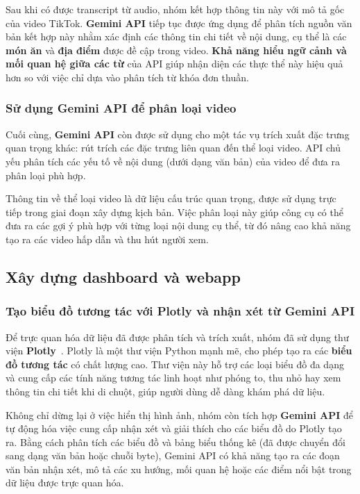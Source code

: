 Sau khi có được transcript từ audio, nhóm kết hợp thông tin này với mô tả gốc của video TikTok. \textbf{Gemini API} tiếp tục được ứng dụng để phân tích nguồn văn bản kết hợp này nhằm xác định các thông tin chi tiết về nội dung, cụ thể là các \textbf{món ăn} và \textbf{địa điểm} được đề cập trong video. \textbf{Khả năng hiểu ngữ cảnh và mối quan hệ giữa các từ} của API giúp nhận diện các thực thể này hiệu quả hơn so với việc chỉ dựa vào phân tích từ khóa đơn thuần.

\subsubsection{Sử dụng Gemini API để phân loại video}

Cuối cùng, \textbf{Gemini API} còn được sử dụng cho một tác vụ trích xuất đặc trưng quan trọng khác: rút trích các đặc trưng liên quan đến thể loại video. API chủ yếu phân tích các yếu tố về nội dung (dưới dạng văn bản) của video để đưa ra phân loại phù hợp.

Thông tin về thể loại video là dữ liệu cấu trúc quan trọng, được sử dụng trực tiếp trong giai đoạn xây dựng kịch bản. Việc phân loại này giúp công cụ có thể đưa ra các gợi ý phù hợp với từng loại nội dung cụ thể, từ đó nâng cao khả năng tạo ra các video hấp dẫn và thu hút người xem.

\subsection{Xây dựng dashboard và webapp}

\subsubsection{Tạo biểu đồ tương tác với Plotly và nhận xét từ Gemini API}

Để trực quan hóa dữ liệu đã được phân tích và trích xuất, nhóm đã sử dụng thư viện \textbf{Plotly}~\cite{plotly}. Plotly là một thư viện Python mạnh mẽ, cho phép tạo ra các \textbf{biểu đồ tương tác} có chất lượng cao. Thư viện này hỗ trợ các loại biểu đồ đa dạng và cung cấp các tính năng tương tác linh hoạt như phóng to, thu nhỏ hay xem thông tin chi tiết khi di chuột, giúp người dùng dễ dàng khám phá dữ liệu.

Không chỉ dừng lại ở việc hiển thị hình ảnh, nhóm còn tích hợp \textbf{Gemini API} để tự động hóa việc cung cấp nhận xét và giải thích cho các biểu đồ do Plotly tạo ra. Bằng cách phân tích các biểu đồ và bảng biểu thống kê (đã được chuyển đổi sang dạng văn bản hoặc chuỗi byte), Gemini API có khả năng tạo ra các đoạn văn bản nhận xét, mô tả các xu hướng, mối quan hệ hoặc các điểm nổi bật trong dữ liệu được trực quan hóa.

